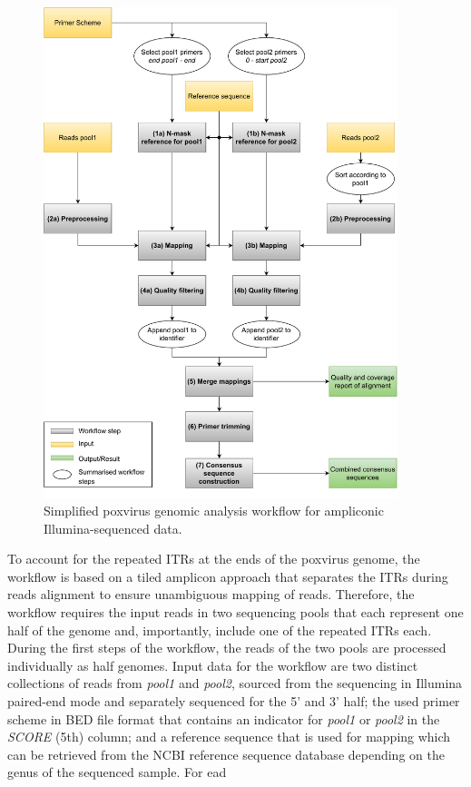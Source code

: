 \begin{figure}[ht!]
	\includegraphics[width=0.92\textwidth]{media/3-pox.pdf}
	\caption{Simplified poxvirus genomic analysis workflow for ampliconic Illumina-sequenced data.}
	\label{fig:3-pox-wf}
\end{figure}

To account for the repeated \acp{ITR} at the ends of the poxvirus genome, the workflow is based on a tiled amplicon approach that separates the \acp{ITR} during reads alignment to ensure unambiguous mapping of reads. Therefore, the workflow requires the input reads in two sequencing pools that each represent one half of the genome and, importantly, include one of the repeated \acp{ITR} each. During the first steps of the workflow, the reads of the two pools are processed individually as half genomes. Input data for the workflow are two distinct collections of reads from \textit{pool1} and \textit{pool2}, sourced from the sequencing in Illumina paired-end mode and separately sequenced for the 5' and 3' half; the used primer scheme in \ac{BED} file format that contains an indicator for \textit{pool1} or \textit{pool2} in the \textit{SCORE} (5th) column; and a reference sequence that is used for mapping which can be retrieved from the \ac{NCBI} reference sequence database depending on the genus of the sequenced sample. For ead\\

